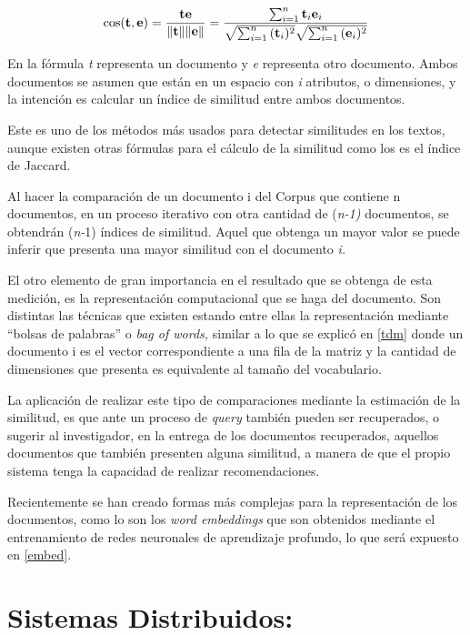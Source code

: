 \documentclass[
  12pt,
  openany]{book}
\begin{document}
\begin{equation}
\cos ({\bf t},{\bf e})= {{\bf t} {\bf e} \over \|{\bf t}\| \|{\bf e}\|} = \frac{ \sum_{i=1}^{n}{{\bf t}_i{\bf e}_i} }{ \sqrt{\sum_{i=1}^{n}{({\bf t}_i)^2}} \sqrt{\sum_{i=1}^{n}{({\bf e}_i)^2}} }
\end{equation}

En la fórmula \emph{t} representa un documento y \emph{e} representa otro documento. Ambos documentos se asumen que están en un espacio con \emph{i} atributos, o dimensiones, y la intención es calcular un índice de similitud entre ambos documentos.

Este es uno de los métodos más usados para detectar similitudes en los textos, aunque existen otras fórmulas para el cálculo de la similitud como los es el índice de Jaccard.

Al hacer la comparación de un documento i del Corpus que contiene n documentos, en un proceso iterativo con otra cantidad de (\emph{n-1)} documentos, se obtendrán (\emph{n-}1) índices de similitud. Aquel que obtenga un mayor valor se puede inferir que presenta una mayor similitud con el documento \emph{i.}

El otro elemento de gran importancia en el resultado que se obtenga de esta medición, es la representación computacional que se haga del documento. Son distintas las técnicas que existen estando entre ellas la representación mediante ``bolsas de palabras'' o \emph{bag of words,} similar a lo que se explicó en \ref{tdm} donde un documento i es el vector correspondiente a una fila de la matriz y la cantidad de dimensiones que presenta es equivalente al tamaño del vocabulario.

La aplicación de realizar este tipo de comparaciones mediante la estimación de la similitud, es que ante un proceso de \emph{query} también pueden ser recuperados, o sugerir al investigador, en la entrega de los documentos recuperados, aquellos documentos que también presenten alguna similitud, a manera de que el propio sistema tenga la capacidad de realizar recomendaciones.

Recientemente se han creado formas más complejas para la representación de los documentos, como lo son los \emph{word embeddings} que son obtenidos mediante el entrenamiento de redes neuronales de aprendizaje profundo, lo que será expuesto en \ref{embed}.

\hypertarget{SD}{%
\section{Sistemas Distribuidos:}\label{SD}}
\end{document}

